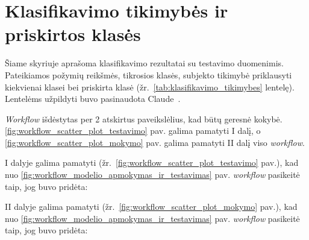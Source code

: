\section{Klasifikavimo tikimybės ir priskirtos klasės}
\label{sec:klasifikavimo_tikimybes_ir_priskirtos_klases}

Šiame skyriuje aprašoma klasifikavimo rezultatai su testavimo duomenimis. Pateikiamos požymių reikšmės, tikrosios klasės, subjekto tikimybė priklausyti kiekvienai klasei bei priskirta klasė (žr.~\ref{tab:klasifikavimo_tikimybes} lentelę). Lentelėms užpildyti buvo pasinaudota Claude~\cite{claude_bendrai}.



\textit{Workflow} išdėstytas per 2 atskirtus paveikslėlius, kad būtų geresnė kokybė. \ref{fig:workflow_scatter_plot_testavimo}
 pav. galima pamatyti I dalį, o \ref{fig:workflow_scatter_plot_mokymo} pav. galima pamatyti II dalį viso \textit{workflow}.

 I dalyje galima pamatyti (žr.~\ref{fig:workflow_scatter_plot_testavimo} pav.), kad nuo \ref{fig:workflow_modelio_apmokymas_ir_testavimas} pav. \textit{workflow} pasikeitė taip, jog buvo pridėta:



II dalyje galima pamatyti (žr.~\ref{fig:workflow_scatter_plot_mokymo} pav.), kad nuo \ref{fig:workflow_modelio_apmokymas_ir_testavimas} pav. \textit{workflow} pasikeitė taip, jog buvo pridėta:




